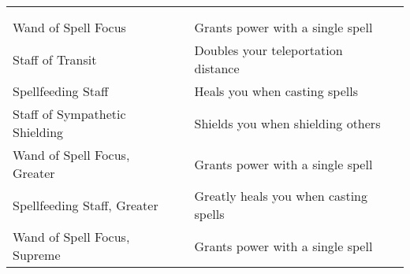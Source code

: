 
\begin{longtabuwrapper}
\begin{longtabu}{l l X l}
 \\
 &  &  &  \\
\bottomrule
Wand of Spell Focus &  & Grants  power with a single spell & \pageref{item:Wand of Spell Focus} \\
Staff of Transit &  & Doubles your teleportation distance & \pageref{item:Staff of Transit} \\
Spellfeeding Staff &  & Heals you when casting spells & \pageref{item:Spellfeeding Staff} \\
Staff of Sympathetic Shielding &  & Shields you when shielding others & \pageref{item:Staff of Sympathetic Shielding} \\
Wand of Spell Focus, Greater &  & Grants  power with a single spell & \pageref{item:Wand of Spell Focus, Greater} \\
Spellfeeding Staff, Greater &  & Greatly heals you when casting spells & \pageref{item:Spellfeeding Staff, Greater} \\
Wand of Spell Focus, Supreme &  & Grants  power with a single spell & \pageref{item:Wand of Spell Focus, Supreme} \\
\end{longtabu}
\end{longtabuwrapper}
